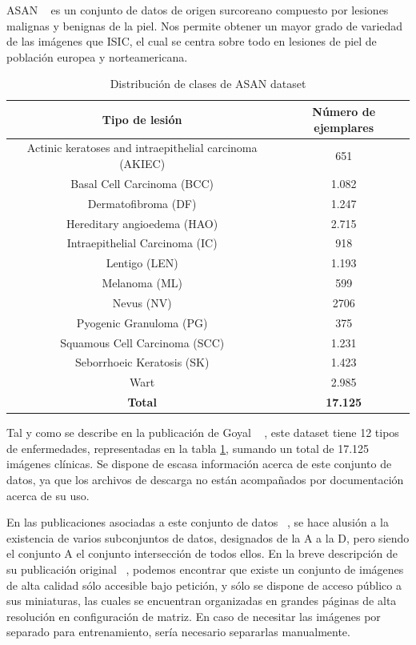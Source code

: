 ASAN ~\cite{Han2017,HAN20181529,HAN20189} es un conjunto de datos de origen surcoreano compuesto por lesiones malignas y benignas de la piel. Nos permite obtener un mayor grado de variedad de las imágenes que ISIC, el cual se centra sobre todo en lesiones de piel de población europea y norteamericana.

\begin{table}[H]
	\centering
	\begin{tabular}{|c|c|}
		\hline
		\textbf{Tipo de lesión} & \textbf{Número de ejemplares} \\ \hline
		{Actinic keratoses and intraepithelial carcinoma (AKIEC)} & 651 \\ \hline
		{Basal Cell Carcinoma (BCC)} & 1.082 \\ \hline
		{Dermatofibroma (DF)} & 1.247 \\ \hline
		{Hereditary angioedema (HAO)} & 2.715 \\ \hline
		{Intraepithelial Carcinoma (IC)} & 918 \\ \hline
		{Lentigo (LEN)} & 1.193 \\ \hline
		{Melanoma (ML)} & 599 \\ \hline
		{Nevus (NV)} & 2706 \\ \hline
		{Pyogenic Granuloma (PG)}  & 375 \\ \hline
		{Squamous Cell Carcinoma (SCC)} & 1.231 \\ \hline
		{Seborrhoeic Keratosis (SK)}  & 1.423 \\ \hline
		{Wart} & 2.985 \\ \hline
		\textbf{Total} & \textbf{17.125} \\ \hline
	\end{tabular}
	\caption{Distribución de clases de ASAN dataset}
	 \label{tab:asandistrib}
\end{table}

Tal y como se describe en la publicación de Goyal ~\cite{goyal2020artificial} , este dataset tiene 12 tipos de enfermedades, representadas en la tabla \ref{tab:asandistrib}, sumando un total de 17.125 imágenes clínicas. Se dispone de escasa información acerca de este conjunto de datos, ya que los archivos de descarga no están acompañados por documentación acerca de su uso.


En las publicaciones asociadas a este conjunto de datos ~\cite{Han2017,HAN20181529,HAN20189}, se hace alusión a la existencia de varios subconjuntos de datos, designados de la A a la D, pero siendo el conjunto A el conjunto intersección de todos ellos. En la breve descripción de su publicación original ~\cite{Han2017}, podemos encontrar que existe un conjunto de imágenes de alta calidad sólo accesible bajo petición, y sólo se dispone de acceso público a sus miniaturas, las cuales se encuentran organizadas en grandes páginas de alta resolución en configuración de matriz. En caso de necesitar las imágenes por separado para entrenamiento, sería necesario separarlas manualmente.

